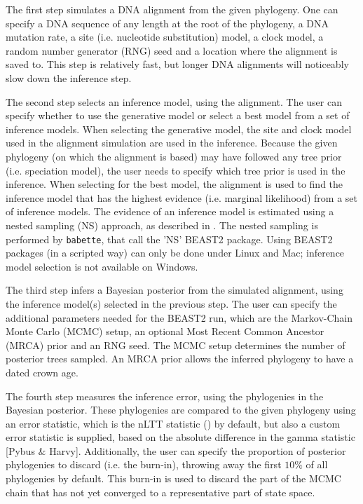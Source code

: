 \documentclass{article}
\begin{document}
The first step simulates a DNA alignment from the given phylogeny.
One can specify a DNA sequence
of any length at the root of the phylogeny, a DNA mutation rate, a
site (i.e. nucleotide substitution) model, 
a clock model, a random number generator (RNG) seed and a location
where the alignment is saved to. This step is relatively fast, but longer
DNA alignments will noticeably slow down the inference step.

The second step selects an inference model, using the alignment.
The user can specify whether to use the generative model or select a best model
from a set of inference models. 
When selecting the generative model,
the site and clock model used in the alignment simulation are used
in the inference. Because the given phylogeny (on which the alignment is based)
may have followed any tree prior (i.e. speciation model), the user needs
to specify which tree prior is used in the inference. 
When selecting for the best
model, the alignment is used to find the inference model that has the
highest evidence (i.e. marginal likelihood) from a set of inference models.
The evidence of an inference model is estimated using a nested sampling (NS)
approach, as described in \cite{maturana2018model}. The nested sampling is
performed by \verb;babette;, that call the 'NS' BEAST2 package. 
Using BEAST2 packages (in a scripted way) can only be done under Linux and Mac; 
inference model selection is not available on Windows.

The third step infers a Bayesian posterior from the simulated alignment,
using the inference model(s) selected in the previous step. The user
can specify the additional parameters needed for the BEAST2 run, which
are the Markov-Chain Monte Carlo (MCMC) setup, 
an optional Most Recent Common Ancestor (MRCA) prior and an RNG seed.
The MCMC setup determines the number of posterior trees sampled.
An MRCA prior allows the inferred phylogeny to have a dated crown age.

The fourth step measures the inference error, using the phylogenies in the
Bayesian posterior. These phylogenies are compared to the given
phylogeny using an error statistic, which is the nLTT 
statistic (\cite{janzen2015approximate}) by default,
but also a custom error statistic is supplied, based
on the absolute difference in the gamma statistic [Pybus $\&$ Harvy]. 
Additionally, the user can specify the
proportion of posterior phylogenies to 
discard (i.e. the burn-in), throwing away the first $10\%$
of all phylogenies by default. This burn-in is used to discard
the part of the MCMC chain that has not yet converged to a
representative part of state space.
\end{document}
